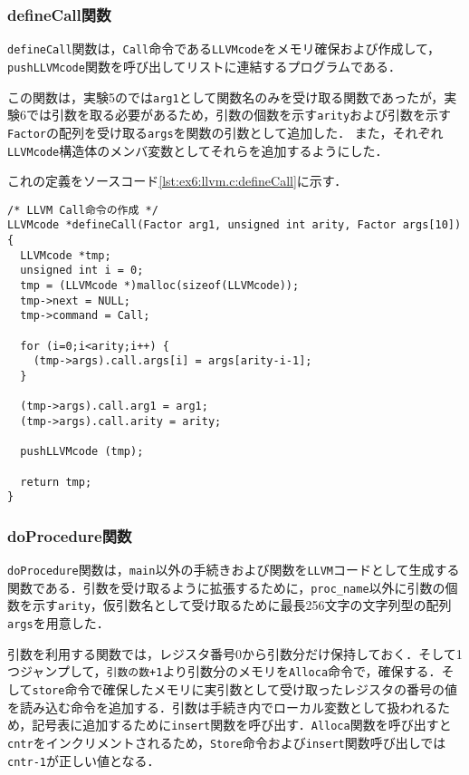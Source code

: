 \documentclass[uplatex]{jsarticle}
\begin{document}
\subsubsection{defineCall関数}
\verb#defineCall#関数は，\verb#Call#命令である\verb#LLVMcode#をメモリ確保および作成して，\verb#pushLLVMcode#関数を呼び出してリストに連結するプログラムである．

この関数は，実験5のでは\verb#arg1#として関数名のみを受け取る関数であったが，実験6では引数を取る必要があるため，引数の個数を示す\verb#arity#および引数を示す\verb#Factor#の配列を受け取る\verb#args#を関数の引数として追加した．
また，それぞれ\verb#LLVMcode#構造体のメンバ変数としてそれらを追加するようにした．

これの定義をソースコード\ref{lst:ex6:llvm.c:defineCall}に示す．

\begin{lstlisting}[caption=defineCall関数の定義,label=lst:ex6:llvm.c:defineRet]
/* LLVM Call命令の作成 */
LLVMcode *defineCall(Factor arg1, unsigned int arity, Factor args[10]){
  LLVMcode *tmp;
  unsigned int i = 0;
  tmp = (LLVMcode *)malloc(sizeof(LLVMcode));
  tmp->next = NULL;
  tmp->command = Call;

  for (i=0;i<arity;i++) {
    (tmp->args).call.args[i] = args[arity-i-1];
  }

  (tmp->args).call.arg1 = arg1;
  (tmp->args).call.arity = arity;

  pushLLVMcode (tmp);

  return tmp;
}
\end{lstlisting}

\subsubsection{doProcedure関数}
\verb#doProcedure#関数は，\verb#main#以外の手続きおよび関数を\verb#LLVM#コードとして生成する関数である．引数を受け取るように拡張するために，\verb#proc_name#以外に引数の個数を示す\verb#arity#，仮引数名として受け取るために最長256文字の文字列型の配列\verb#args#を用意した．

引数を利用する関数では，レジスタ番号0から引数分だけ保持しておく．そして1つジャンプして，\verb#引数の数+1#より引数分のメモリを\verb#Alloca#命令で，確保する．そして\verb#store#命令で確保したメモリに実引数として受け取ったレジスタの番号の値を読み込む命令を追加する．引数は手続き内でローカル変数として扱われるため，記号表に追加するために\verb#insert#関数を呼び出す．\verb#Alloca#関数を呼び出すと\verb#cntr#をインクリメントされるため，\verb#Store#命令および\verb#insert#関数呼び出しでは\verb#cntr-1#が正しい値となる．
\end{document}
